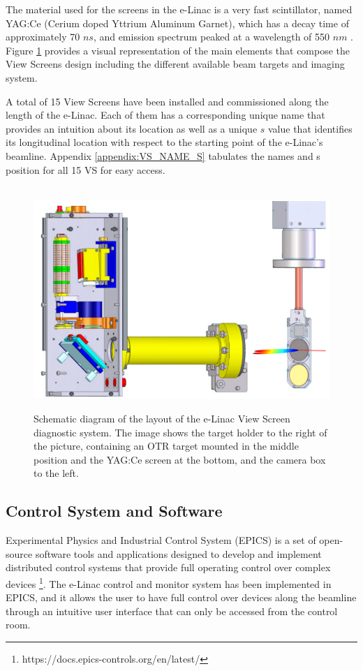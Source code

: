 \documentclass{article}
\begin{document}
The material used for the screens in the e-Linac is a very fast scintillator, named YAG:Ce (Cerium doped Yttrium Aluminum Garnet), which has a decay time of approximately 70 $ns$, and emission spectrum peaked at a wavelength of 550 $nm$ \cite{storey2011view}. Figure \ref{fig:5} provides a visual representation of the main elements that compose the View Screens design including the different available beam targets and imaging system. 

A total of 15 View Screens have been installed and commissioned along the length of the e-Linac. Each of them has a corresponding unique name that provides an intuition about its location as well as a unique $s$ value that identifies its longitudinal location with respect to the starting point of the e-Linac's beamline. Appendix \ref{appendix:VS_NAME_S} tabulates the names and s position for all 15 VS for easy access.

\newpage    
\begin{figure}[!h]  
    \centerline{\ \includegraphics[width=\linewidth]{images/viewscreen_system.png}}
    \caption{Schematic diagram of the layout of the e-Linac View Screen diagnostic system. The image shows the target holder to the right of the picture, containing an OTR target mounted in the middle position and the YAG:Ce screen at the bottom, and the camera box to the left. }
    \label{fig:5}
\end{figure} 

\subsection{Control System and Software}

Experimental Physics and Industrial Control System (EPICS) is a set of open-source software tools and applications designed to develop and implement distributed control systems that provide full operating control over complex devices \footnote{https://docs.epics-controls.org/en/latest/}. The e-Linac control and monitor system has been implemented in EPICS, and it allows the user to have full control over devices along the beamline through an intuitive user interface that can only be accessed from the control room. 
\end{document}
